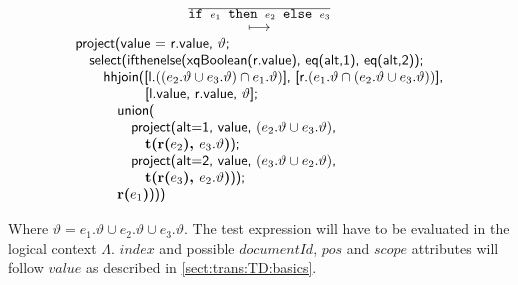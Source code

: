 \begin{equation}
\begin{array}{c}
\frac{}{\mbox{\texttt{if }}e_1\mbox{\texttt{ then }}e_2\mbox{\texttt{ else }}e_3} \\
\longmapsto \\
\begin{array}{l}
\mbox{\textsf{project(value = r.value, }}\vartheta\mbox{\textsf{;}} \\ \quad
\mbox{\textsf{select(ifthenelse(xqBoolean(r.value), eq(alt,1), eq(alt,2));}} \\ \quad \quad
\mbox{\textsf{hhjoin([l.}}((e_2.\vartheta \cup e_3.\vartheta)\cap e_1.\vartheta)\mbox{\textsf{],
[r.}}(e_1.\vartheta\cap (e_2.\vartheta\cup e_3.\vartheta))
\mbox{\textsf{],}} 
\\  \quad \quad \quad \quad \quad\mbox{\textsf{[l.value, r.value, }}\vartheta\mbox{\textsf{];}}\\\quad\quad\quad
\mbox{\textsf{union(}} \\ \quad\quad\quad\quad
\mbox{\textsf{project(alt=1, value, }}(e_2.\vartheta \cup e_3.\vartheta)\mbox{\textsf{,}}\\\quad\quad\quad\quad\quad
\mbox{\textbf{t(r(}}e_2\mbox{\textbf{), }}e_3.\vartheta\mbox{\textbf{)}\textsf{);}} \\ \quad\quad\quad\quad
\mbox{\textsf{project(alt=2, value, }}(e_3.\vartheta\cup e_2.\vartheta)\mbox{\textsf{,}}\\\quad\quad\quad\quad\quad
\mbox{\textbf{t(r(}}e_3\mbox{\textbf{), }}e_2.\vartheta\mbox{\textbf{)}\textsf{));}}\\\quad\quad\quad
\mbox{\textbf{r(}}e_1\mbox{\textbf{)}\textsf{)))}}
\end{array}
\end{array}
\end{equation}

Where $\vartheta = e_1.\vartheta \cup e_2.\vartheta \cup e_3.\vartheta$. The test expression will have to be
evaluated in the logical context $\Lambda$. $index$ and possible $documentId$, $pos$ and $scope$ attributes will
follow $value$ as described in \ref{sect:trans:TD:basics}.

